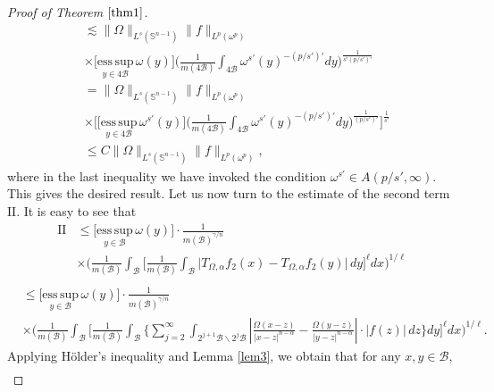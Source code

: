 \documentclass[preprint,10pt]{elsarticle}
\numberwithin{equation}{section}
\begin{document}
\begin{proof}[Proof of Theorem $\ref{thm1}$]
\begin{equation*}
\begin{split}
&\lesssim\|\Omega\|_{L^s(\mathbb{S}^{n-1})}\|f\|_{L^p(\omega^p)}\\
&\times\Big[\underset{y\in 4\mathcal{B}}{\mathrm{ess\,sup}}\,\omega(y)\Big]
\bigg(\frac{1}{m(4\mathcal{B})}\int_{4\mathcal{B}}\omega^{s'}(y)^{-(p/{s'})'}dy\bigg)^{\frac{1}{s'(p/{s'})'}}\\
&=\|\Omega\|_{L^s(\mathbb{S}^{n-1})}\|f\|_{L^p(\omega^p)}\\
&\times\bigg[\Big[\underset{y\in 4\mathcal{B}}{\mathrm{ess\,sup}}\,\omega^{s'}(y)\Big]
\bigg(\frac{1}{m(4\mathcal{B})}\int_{4\mathcal{B}}\omega^{s'}(y)^{-(p/{s'})'}dy\bigg)^{\frac{1}{(p/{s'})'}}\bigg]^{\frac{1}{s'}}\\
&\leq C\|\Omega\|_{L^s(\mathbb{S}^{n-1})}\|f\|_{L^p(\omega^p)},
\end{split}
\end{equation*}
where in the last inequality we have invoked the condition $\omega^{s'}\in A(p/{s'},\infty)$. This gives the desired result.
Let us now turn to the estimate of the second term $\mathrm{II}$. It is easy to see that
\begin{equation*}
\begin{split}
\mathrm{II}&\leq\Big[\underset{y\in \mathcal{B}}{\mathrm{ess\,sup}}\,\omega(y)\Big]
\cdot\frac{1}{m(\mathcal{B})^{\gamma/n}}\\
&\times\bigg(\frac{1}{m(\mathcal{B})}\int_{\mathcal{B}}\bigg[\frac{1}{m(\mathcal{B})}
\int_{\mathcal{B}}\big|T_{\Omega,\alpha}f_2(x)-T_{\Omega,\alpha}f_2(y)\big|\,dy\bigg]^{\ell}dx\bigg)^{1/{\ell}}\\
\end{split}
\end{equation*}
\begin{equation*}
\begin{split}
&\leq\Big[\underset{y\in \mathcal{B}}{\mathrm{ess\,sup}}\,\omega(y)\Big]\cdot\frac{1}{m(\mathcal{B})^{\gamma/n}}\\
&\times\bigg(\frac{1}{m(\mathcal{B})}\int_{\mathcal{B}}
\bigg[\frac{1}{m(\mathcal{B})}\int_{\mathcal{B}}\bigg\{\sum_{j=2}^\infty\int_{2^{j+1}\mathcal{B}\backslash 2^j\mathcal{B}}
\left|\frac{\Omega(x-z)}{|x-z|^{n-\alpha}}-\frac{\Omega(y-z)}{|y-z|^{n-\alpha}}\right|\cdot|f(z)|\,dz\bigg\}dy\bigg]^{\ell}dx\bigg)^{1/{\ell}}.
\end{split}
\end{equation*}
Applying H\"{o}lder's inequality and Lemma \ref{lem3}, we obtain that for any $x,y\in \mathcal{B}$,
\begin{equation*}
\begin{split}

\end{split}
\end{equation*}
\end{proof}
\end{document}

